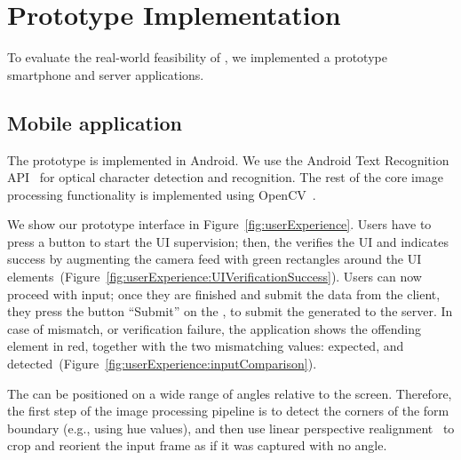 %
 \section{Prototype Implementation} \label{sec:prototypeImplementation}

To evaluate the real-world feasibility of \sysname, we implemented a prototype smartphone and server applications.

\subsection{Mobile application}
\label{sec:mobile_app}
The prototype \app is implemented in Android.
We use the Android Text Recognition API~\cite{googleOCR} for optical character detection and recognition.
The rest of the core image processing functionality is implemented using OpenCV~\cite{openCV}.




We show our prototype interface in Figure~\ref{fig:userExperience}.
Users have to press a button to start the UI supervision; then, the \app verifies the UI and indicates success by augmenting the camera feed with green rectangles around the UI elements~(Figure~\ref{fig:userExperience:UIVerificationSuccess}).
Users can now proceed with input; once they are finished and submit the data from the client, they press the button ``Submit'' on the \app, to submit the generated \POI to the server.
In case of mismatch, or verification failure, the application shows the offending element in red, together with the two mismatching values: expected, and detected~(Figure~\ref{fig:userExperience:inputComparison}).


The \md can be positioned on a wide range of angles relative to the \client screen.
Therefore, the first step of the image processing pipeline is to detect the corners of the form boundary (e.g., using hue values), and then use linear perspective realignment~\cite{perspectiveTransform} to crop and reorient the input frame as if it was captured with no angle.


